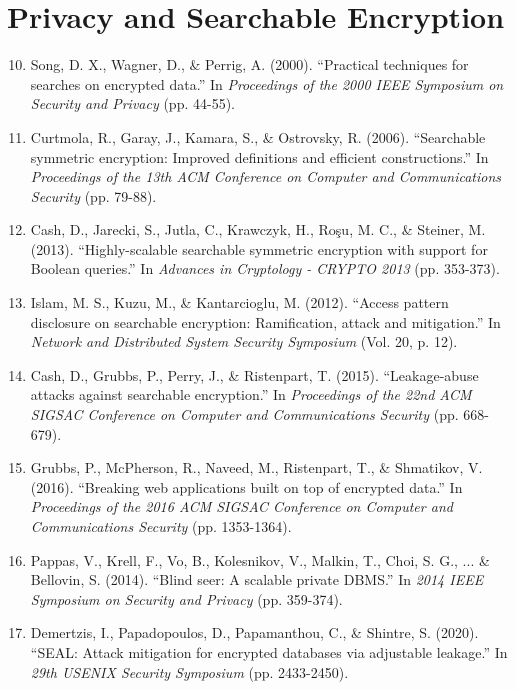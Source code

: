 \section*{Privacy and Searchable Encryption}

\begin{enumerate}
\setcounter{enumi}{9}
\item Song, D. X., Wagner, D., \& Perrig, A. (2000). ``Practical techniques for searches on encrypted data.'' In \textit{Proceedings of the 2000 IEEE Symposium on Security and Privacy} (pp. 44-55).

\item Curtmola, R., Garay, J., Kamara, S., \& Ostrovsky, R. (2006). ``Searchable symmetric encryption: Improved definitions and efficient constructions.'' In \textit{Proceedings of the 13th ACM Conference on Computer and Communications Security} (pp. 79-88).

\item Cash, D., Jarecki, S., Jutla, C., Krawczyk, H., Roşu, M. C., \& Steiner, M. (2013). ``Highly-scalable searchable symmetric encryption with support for Boolean queries.'' In \textit{Advances in Cryptology - CRYPTO 2013} (pp. 353-373).

\item Islam, M. S., Kuzu, M., \& Kantarcioglu, M. (2012). ``Access pattern disclosure on searchable encryption: Ramification, attack and mitigation.'' In \textit{Network and Distributed System Security Symposium} (Vol. 20, p. 12).

\item Cash, D., Grubbs, P., Perry, J., \& Ristenpart, T. (2015). ``Leakage-abuse attacks against searchable encryption.'' In \textit{Proceedings of the 22nd ACM SIGSAC Conference on Computer and Communications Security} (pp. 668-679).

\item Grubbs, P., McPherson, R., Naveed, M., Ristenpart, T., \& Shmatikov, V. (2016). ``Breaking web applications built on top of encrypted data.'' In \textit{Proceedings of the 2016 ACM SIGSAC Conference on Computer and Communications Security} (pp. 1353-1364).

\item Pappas, V., Krell, F., Vo, B., Kolesnikov, V., Malkin, T., Choi, S. G., ... \& Bellovin, S. (2014). ``Blind seer: A scalable private DBMS.'' In \textit{2014 IEEE Symposium on Security and Privacy} (pp. 359-374).

\item Demertzis, I., Papadopoulos, D., Papamanthou, C., \& Shintre, S. (2020). ``SEAL: Attack mitigation for encrypted databases via adjustable leakage.'' In \textit{29th USENIX Security Symposium} (pp. 2433-2450).
\end{enumerate}

